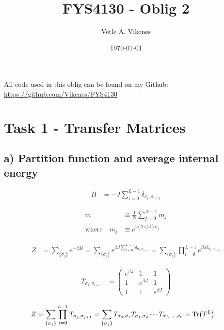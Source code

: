 \documentclass[reprint,english,notitlepage,aps,nobalancelastpage,nofootinbib]{revtex4-1}
\newcommand{\sumstate}{\sum_{\{\sigma_j\}}}
\newcommand{\prodstate}{\prod_{i=0}^{L-1}}
\newcommand{\ebj}{e^{\beta J}}
\newcommand{\T}[1]{T_{\sigma_{#1},\sigma_{#1 + 1}}}
\begin{document}
\begin{center}
\title{\Huge FYS4130 - Oblig 2}
\author{\large Vetle A. Vikenes}
\date{\today}
\noaffiliation


\maketitle
\end{center}
\onecolumngrid

All code used in this oblig can be found on my Github: \url{https://github.com/Vikenes/FYS4130}
\\
\section*{\large Task 1 - Transfer Matrices}

\subsection*{a) Partition function and average internal energy}

\begin{align} \label{eq:Hamiltonian}
	H &= -J \sum_{i=0}^{L-1} \delta_{\sigma_i,\sigma_{i+1}}
\end{align}

\begin{align}
	m &\equiv \frac{1}{N} \sum_{j=0}^{N-1} m_j \label{eq:order parameter}  \\ 
	\text{where}\quad m_j &\equiv e^{i(2\pi/3)\sigma_j} \label{eq:magnetization}
\end{align}


\begin{align*}
	Z &= \sum_{\{\sigma_j\}} e^{-\beta H} = \sumstate e^{\beta J \sum_{i=0}^{L-1} \delta_{\sigma_i,\sigma_{i+1}}} = \sumstate \prod_{i=0}^{L-1} e^{\beta J \delta_{\sigma_i,\sigma_{i+1}}}
\end{align*}

\begin{align*}
	T_{\sigma_i,\sigma_{i+1}} &= 
	\begin{pmatrix}
		e^{\beta J} & 1 & 1 \\
		1 & \ebj & 1 \\
		1 & 1 & \ebj
	\end{pmatrix}
\end{align*}

\begin{align*}
	Z &= \sumstate \prodstate \T{j} = \sumstate T_{\sigma_0,\sigma_1} T_{\sigma_1,\sigma_2}\cdots T_{\sigma_{L-1},\sigma_0} = \Tr(T^L)
\end{align*}
\end{document}
